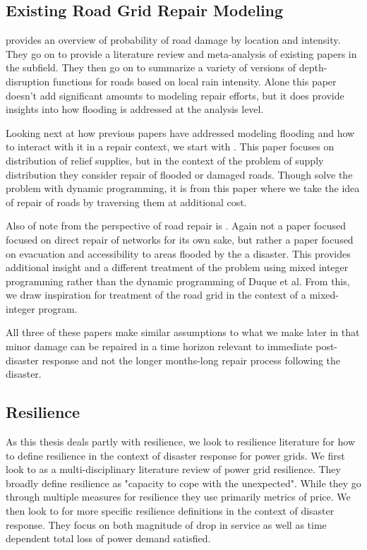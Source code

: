 \documentclass{article}
\begin{document}
	\subsection{Existing Road Grid Repair Modeling}
		\cite{PregnolatoEA2017} provides an overview of probability of road damage by location and intensity. They go on to provide a literature review and meta-analysis of existing papers in the subfield. They then go on to summarize a variety of versions of depth-disruption functions for roads based on local rain intensity. Alone this paper doesn't add significant amounts to modeling repair efforts, but it does provide insights into how flooding is addressed at the analysis level.
		
		Looking next at how previous papers have addressed modeling flooding and how to interact with it in a repair context, we start with \cite{DuqueEA2016}. This paper focuses on distribution of relief supplies, but in the context of the problem of supply distribution they consider repair of flooded or damaged roads. Though solve the problem with dynamic programming, it is from this paper where we take the idea of repair of roads by traversing them at additional cost.
		
		Also of note from the perspective of road repair is \cite{AksuEA2014}. Again not a paper focused focused on direct repair of networks for its own sake, but rather a paper focused on evacuation and accessibility to areas flooded by the a disaster. This provides additional insight and a different treatment of the problem using mixed integer programming rather than the dynamic programming of Duque et al. From this, we draw inspiration for treatment of the road grid in the context of a mixed-integer program.
		
		All three of these papers make similar assumptions to what we make later in that minor damage can be repaired in a time horizon relevant to immediate post-disaster response and not the longer months-long repair process following the disaster. 
	
	\subsection{Resilience}
		As this thesis deals partly with resilience, we look to resilience literature for how to define resilience in the context of disaster response for power grids. We first look to \cite{MolyneauxEA2016} as a multi-disciplinary literature review of power grid resilience. They broadly define resilience as "capacity to cope with the unexpected". While they go through multiple measures for resilience they use primarily metrics of price. We then look to \cite{Panteli2017} for more specific resilience definitions in the context of disaster response. They focus on both magnitude of drop in service as well as time dependent total loss of power demand satisfied.
		
\end{document}
